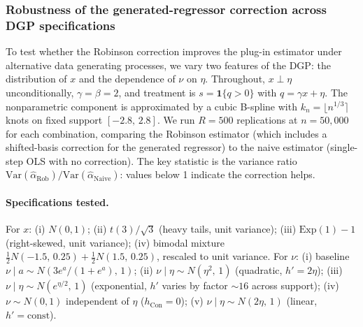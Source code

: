 \subsubsection{Robustness of the generated-regressor correction across DGP specifications}

To test whether the Robinson correction improves the plug-in estimator under alternative data generating processes, we vary two features of the DGP: the distribution of $x$ and the dependence of $\nu$ on $\eta$. Throughout, $x \perp \eta$ unconditionally, $\gamma = \beta = 2$, and treatment is $s = \mathbf{1}\{q > 0\}$ with $q = \gamma x + \eta$. The nonparametric component is approximated by a cubic B-spline with $k_n = \lfloor n^{1/3}\rceil$ knots on fixed support $[-2.8,\,2.8]$. We run $R = 500$ replications at $n = 50{,}000$ for each combination, comparing the Robinson estimator (which includes a shifted-basis correction for the generated regressor) to the naive estimator (single-step OLS with no correction). The key statistic is the variance ratio $\mathrm{Var}(\hat\alpha_{\mathrm{Rob}}) / \mathrm{Var}(\hat\alpha_{\mathrm{Naive}})$: values below 1 indicate the correction helps.

\paragraph{Specifications tested.}
For $x$: (i) $N(0,1)$; (ii) $t(3)/\sqrt{3}$ (heavy tails, unit variance); (iii) $\mathrm{Exp}(1) - 1$ (right-skewed, unit variance); (iv) bimodal mixture $\frac{1}{2}N(-1.5,\,0.25) + \frac{1}{2}N(1.5,\,0.25)$, rescaled to unit variance.
For $\nu$: (i) baseline $\nu \mid a \sim N(3e^a/(1+e^a),\,1)$; (ii) $\nu \mid \eta \sim N(\eta^2,\,1)$ (quadratic, $h' = 2\eta$); (iii) $\nu \mid \eta \sim N(e^{\eta/2},\,1)$ (exponential, $h'$ varies by factor $\sim\!16$ across support); (iv) $\nu \sim N(0,1)$ independent of $\eta$ ($h_{\mathrm{Con}} = 0$); (v) $\nu \mid \eta \sim N(2\eta,\,1)$ (linear, $h' = \mathrm{const}$).

